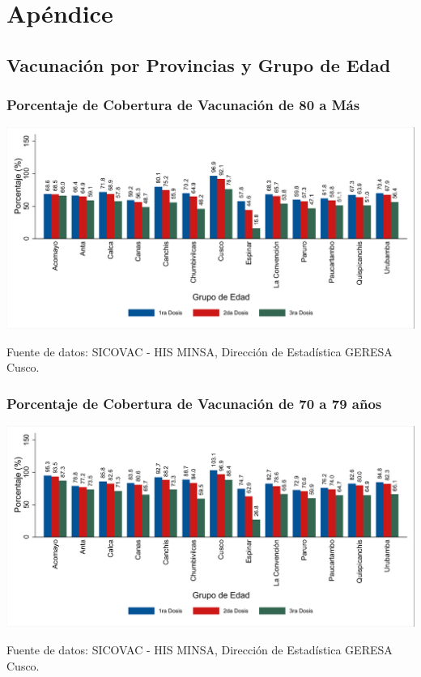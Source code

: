 \documentclass[xcolor=table]{beamer}
\begin{document}
\appendix
\section{Apéndice}

\subsection{Vacunación por Provincias y Grupo de Edad}

\begin{frame}[label=vacunas_90]
	\frametitle{Porcentaje de Cobertura de Vacunación de 80 a Más}
	\vspace{-.5cm}
	\begin{center}
		\includegraphics[width=1.0\linewidth, trim={.2cm .5cm .2cm .2cm},clip]{../figuras/vacunacion_provincial_edad_practica_9.pdf}
	\end{center}
	{\tiny Fuente de datos: SICOVAC - HIS MINSA, Dirección de Estadística GERESA Cusco. \\}
	\hyperlink{cobertura_vacuna_provincias}{}
\end{frame}

\begin{frame}[label=vacunas_80]
	\frametitle{Porcentaje de Cobertura de Vacunación de 70 a 79 años}
	\vspace{-.5cm}
	\begin{center}
		\includegraphics[width=1.0\linewidth, trim={.2cm .5cm .2cm .2cm},clip]{../figuras/vacunacion_provincial_edad_practica_8.pdf}
	\end{center}
	{\tiny Fuente de datos: SICOVAC - HIS MINSA, Dirección de Estadística GERESA Cusco. \\}
	\hyperlink{cobertura_vacuna_provincias}{}
\end{frame}
\end{document}
